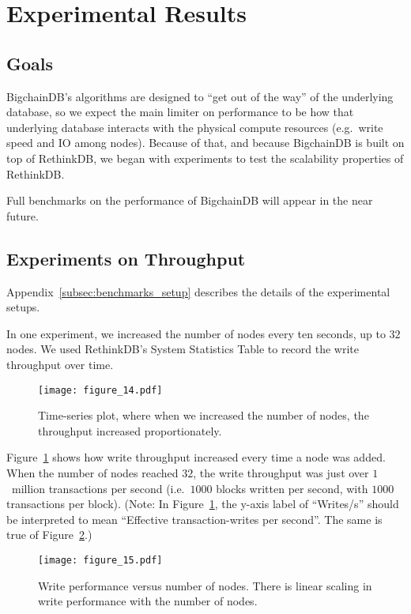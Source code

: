 \section{Experimental Results}\label{sec:benchmarks}

\subsection{Goals}

BigchainDB's algorithms are designed to ``get out of the way'' of the underlying database, so we expect the main limiter on performance to be how that underlying database interacts with the physical compute resources (e.g.~write speed and IO among nodes).
Because of that, and because BigchainDB is built on top of RethinkDB, we began with experiments to test the scalability properties of RethinkDB.

Full benchmarks on the performance of BigchainDB will appear in the near future.

\subsection{Experiments on Throughput}

Appendix~\ref{subsec:benchmarks_setup} describes the details of the experimental setups.

In one experiment, we increased the number of nodes every ten seconds, up to $32$ nodes.
We used RethinkDB's System Statistics Table to record the write throughput over time.

\begin{figure}[!ht]
  \centering
  \texttt{[image: figure\_14.pdf]}
  \caption{Time-series plot, where when we increased the number of nodes, the throughput increased proportionately.}
  \label{fig:bigchain_throughput_vs_nodes}
\end{figure}

Figure~\ref{fig:bigchain_throughput_vs_nodes} shows how write throughput increased every time a node was added.
When the number of nodes reached $32$, the write throughput was just over $1$~million transactions per second (i.e.~$1000$ blocks written per second, with $1000$ transactions per block). (Note: In Figure~\ref{fig:bigchain_throughput_vs_nodes}, the y-axis label of ``Writes/s'' should be interpreted to mean ``Effective transaction-writes per second''. The same is true of Figure~\ref{fig:bigchain_writes_vs_nodes}.)

\begin{figure}[!ht]
  \centering
  \texttt{[image: figure\_15.pdf]}
  \caption{Write performance versus number of nodes. There is linear scaling in write performance with the number of nodes.}
  \label{fig:bigchain_writes_vs_nodes}
\end{figure}

